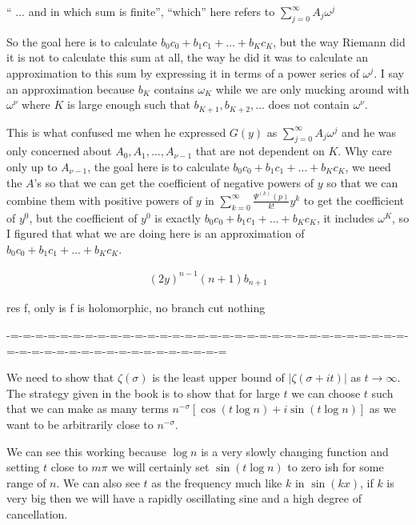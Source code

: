 \documentclass[aps,preprint,preprintnumbers,nofootinbib,showpacs,prd]{revtex4-1}
\newcommand{\nbea}{\begin{eqnarray*}}
\newcommand{\neea}{\end{eqnarray*}}
\begin{document}
`` $\dots$ and in which sum is finite'', ``which'' here refers to $\sum_{j=0}^\infty A_j \omega^j$


So the goal here is to calculate $b_0 c_0 + b_1 c_1 + \dots + b_Kc_K$, but the way Riemann did it is not to calculate this sum at all, the way he did it was to calculate an approximation to this sum by expressing it in terms of a power series of $\omega^j$. I say an approximation because $b_K$ contains $\omega_K$ while we are only mucking around with $\omega^\nu$ where $K$ is large enough such that $b_{K+1}, b_{K+2}, \dots$ does not contain $\omega^\nu$.

This is what confused me when he expressed $G(y)$ as $\sum_{j=0}^\infty A_j \omega^j$ and he was only concerned about $A_0, A_1, \dots, A_{\nu-1}$ that are not dependent on $K$. Why care only up to $A_{\nu-1}$, the goal here is to calculate $b_0 c_0 + b_1 c_1 + \dots + b_Kc_K$, we need the $A$'s so that we can get the coefficient of negative powers of $y$ so that we can combine them with positive powers of $y$ in $\sum_{k=0}^\infty \frac{\Psi^{(k)}(p)}{k!} y^k$ to get the coefficient of $y^0$, but the coefficient of $y^0$ is exactly $b_0 c_0 + b_1 c_1 + \dots + b_Kc_K$, it includes $\omega^K$, so I figured that what we are doing here is an approximation of $b_0 c_0 + b_1 c_1 + \dots + b_Kc_K$.



%
\nbea
(2y)^{n-1}(n+1)b_{n+1}
\neea
%















res f, only is f is holomorphic, no branch cut nothing




-=-=-=-=-=-=-=-=-=-=-=-=-=-=-=-=-=-=-=-=-=-=-=-=-=-=-=-=-=-=-=-=-=-=-=-=-=-=-=-=-=-=-=-=-=-=-=-=-=-=


We need to show that $\zeta(\sigma)$ is the least upper bound of $|\zeta(\sigma + it)|$ as $t\to\infty$. The strategy given in the book is to show that for large $t$ we can choose $t$ such that we can make as many terms $n^{-\sigma}[\cos(t\log n) + i\sin(t\log n)]$ as we want to be arbitrarily close to $n^{-\sigma}$.

We can see this working because $\log n$ is a very slowly changing function and setting $t$ close to $m\pi$ we will certainly set $\sin(t\log n)$ to zero ish for some range of $n$. We can also see $t$ as the frequency much like $k$ in $\sin (kx)$, if $k$ is very big then we will have a rapidly oscillating sine and a high degree of cancellation.
\end{document}
